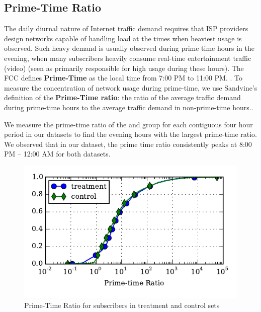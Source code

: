 \subsection{Prime-Time Ratio} \label{subsec:primetime}

The daily diurnal nature of Internet traffic demand requires that ISP providers 
design networks capable of handling load at the times when heaviest usage is 
observed. Such heavy demand is usually observed during prime time hours in the 
evening, when many subscribers heavily consume real-time entertainment traffic
(video) (seen as primarily responsible for high usage during these hours). The FCC defines 
\textbf{Prime-Time} as the local time from 7:00 PM to 11:00 PM.
\cite{fcc2014measuring-broadband}. To measure the concentration of network usage
during prime-time, we use Sandvine's definition of the \textbf{Prime-Time 
ratio}: the ratio of the average traffic demand during prime-time hours to the average 
traffic demand in non-prime-time hours.\cite{sandvine20141h, sandvine20142h}.

We measure the prime-time ratio of the \control{} and \treatment{} group
for each contiguous four hour period in our datasets to find the evening hours with
the largest prime-time ratio. We observed that in our dataset,
the prime time ratio consistently peaks at 8:00 PM -- 12:00 AM for both
datasets.

\begin{figure}[t]
\begin{minipage}{\linewidth}
\centering
\includegraphics[]{figures/prime-time-ratio-per-device-cdf-MEAN.pdf}
\caption{Prime-Time Ratio for subscribers in treatment and control 
sets\label{fig:cdf-prime-time-ratio}}
\end{minipage}
\end{figure}


